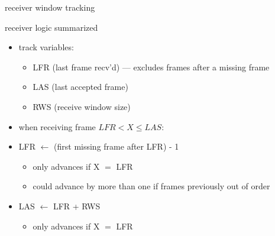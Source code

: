 \begin{frame}{receiver window tracking}
\end{frame}

\begin{frame}{receiver logic summarized}
\begin{itemize}
\item track variables:
    \begin{itemize}
    \item LFR (last frame recv'd) --- excludes frames after a missing frame
    \item LAS (last accepted frame)
    \item RWS (receive window size)
    \end{itemize}
\item when receiving frame $LFR < X \le LAS$:
\item LFR $\leftarrow$ (first missing frame after LFR) - 1
    \begin{itemize}
    \item only advances if X $=$ LFR
    \item could advance by more than one if frames previously out of order
    \end{itemize}
\item LAS $\leftarrow$ LFR + RWS
    \begin{itemize}
    \item only advances if X $=$ LFR
    \end{itemize}
\end{itemize}
\end{frame}
